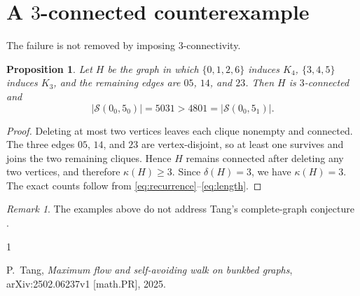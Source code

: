 \documentclass[11pt]{amsart}
\newtheorem{proposition}[theorem]{Proposition}
\theoremstyle{remark}
\newtheorem{remark}[theorem]{Remark}
\newcommand{\SAW}{\mathcal S}
\begin{document}
\section{A \texorpdfstring{$3$}{3}-connected counterexample}

The failure is not removed by imposing $3$-connectivity.

\begin{proposition}
Let $H$ be the graph in which $\{0,1,2,6\}$ induces $K_4$,
$\{3,4,5\}$ induces $K_3$, and the remaining edges are $05$, $14$,
and $23$. Then $H$ is $3$-connected and
\[
  |\SAW(0_0,5_0)|=5031>4801=|\SAW(0_0,5_1)|.
\]
\end{proposition}

\begin{proof}
Deleting at most two vertices leaves each clique nonempty and
connected. The three edges $05$, $14$, and $23$ are vertex-disjoint,
so at least one survives and joins the two remaining cliques. Hence
$H$ remains connected after deleting any two vertices, and therefore
$\kappa(H)\ge 3$. Since $\delta(H)=3$, we have $\kappa(H)=3$.
The exact counts follow from
\eqref{eq:recurrence}--\eqref{eq:length}.
\end{proof}

\begin{remark}
The examples above do not address Tang's complete-graph conjecture
\cite[Conjecture~1.8]{Tang}.
\end{remark}

\begin{thebibliography}{1}

P.~Tang,
\emph{Maximum flow and self-avoiding walk on bunkbed graphs},
arXiv:2502.06237v1 [math.PR], 2025.

\end{thebibliography}
\end{document}

